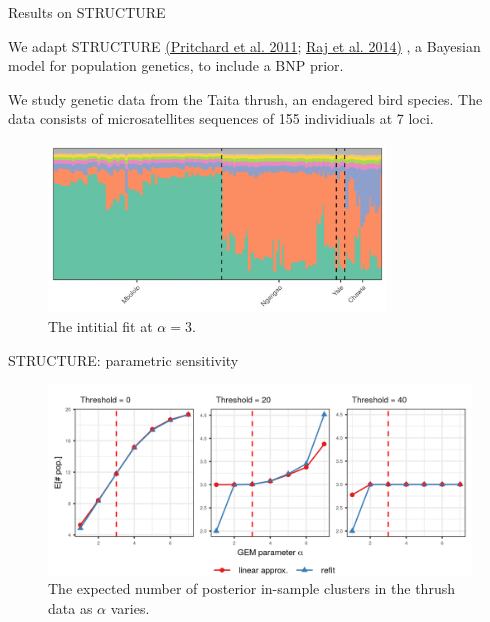 \begin{frame}{Results on STRUCTURE}

We adapt STRUCTURE
{\color{blue} \href{https://web.stanford.edu/group/pritchardlab/publications/pdfs/PritchardEtAl00.pdf}{(Pritchard et al. 2011};
\href{https://www.genetics.org/content/197/2/573}{Raj et al. 2014)}
},
a Bayesian model for population genetics, to include a BNP prior.


We study genetic data from the Taita thrush, an endagered bird species.
The data consists of microsatellites sequences of 155 individiuals at 7 loci.

\begin{figure}[!h]
\centering
\includegraphics[width = 0.8\textwidth]{./figures/structure_example.png}
\caption{The intitial fit at $\alpha = 3$. }
\end{figure}
\end{frame}

\begin{frame}{STRUCTURE: parametric sensitivity}
  \begin{figure}[!h]
    \centering
    \includegraphics[width = \textwidth]{./figures/stucture_alpha_sens.png}
    \caption*{The expected number of posterior in-sample clusters in the thrush data as $\alpha$ varies.}
  \end{figure}

\end{frame}

